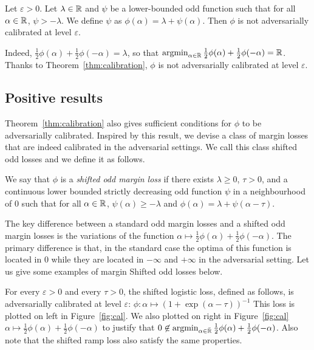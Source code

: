 \begin{coro} Let $\varepsilon>0$. Let $\lambda\in \mathbb{R}$ and \textcolor{black}{$\psi$} be a lower-bounded odd function such that for all $\alpha\in\mathbb{R}$, $\psi>-\lambda$. We define $\psi$ as  $\phi(\alpha) = \lambda +\psi(\alpha)$. Then $\phi$ is not adversarially calibrated at level $\varepsilon$.
\end{coro}
Indeed, $\frac12{\phi}(\alpha)+\frac12{\phi}(-\alpha) =  \lambda$, so that $ \operatorname*{argmin}_{\alpha\in\mathbb{R}}
\frac12\phi(\alpha)+\frac12\phi(-\alpha) = \mathbb{R}$. Thanks to Theorem~\ref{thm:calibration}, $\phi$ is not adversarially calibrated at level $\varepsilon$.


\subsection{Positive results}

Theorem~\ref{thm:calibration} also gives sufficient conditions for $\phi$ to be adversarially calibrated. Inspired by this result, we devise a class of margin losses that are indeed calibrated in the adversarial settings. We call this class shifted odd losses and we define it as follows.
\begin{definition}
\label{def:shifted}
We say that $\phi$ is a \emph{shifted odd margin loss} if there exists $\lambda\geq0$, $\tau>0$, and a continuous lower bounded strictly decreasing odd function \textcolor{black}{$\psi$} in a neighbourhood of $0$ such that for all $\alpha\in\mathbb{R}$, $\psi(\alpha)\geq -\lambda$ and $\phi(\alpha) = \lambda+\psi(\alpha-\tau)$. 
\end{definition}

The key difference between a standard odd margin losses and a shifted odd margin losses is the variations of the function $\alpha\mapsto\frac12\phi(\alpha)+\frac12\phi(-\alpha)$. 
The primary difference is that, in the standard case the optima of this function is located in $0$ while they are located in $-\infty$ and $+\infty$ in the adversarial setting. Let us give some examples of margin Shifted odd losses below.

 
\begin{example*}
For every $\varepsilon>0$ and every $\tau>0$, the shifted logistic loss, defined as follows, is adversarially calibrated at level $\varepsilon$:
$\phi:\alpha\mapsto \left(1+\exp{\left(\alpha-\tau\right)}\right)^{-1}$
This loss is plotted on left in Figure~\ref{fig:cal}. We also plotted on right in Figure~\ref{fig:cal} $\alpha\mapsto\frac12\phi(\alpha)+\frac12\phi(-\alpha)$ to justify that $0\not\in\operatorname*{argmin}_{\alpha\in\bar{\mathbb{R}}}\frac12\phi(\alpha)+\frac12\phi(-\alpha)$. Also note that the shifted ramp loss also satisfy the same properties.
\end{example*}

